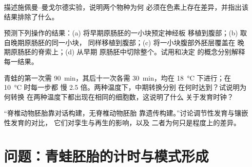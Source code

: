 \begin{exercise}[$\star\star$]\label{exo:b2:vertebrate-development:9}
描述施佩曼–曼戈尔德实验，说明两个物种为何
必须在色素上存在差异，并指出该结果排除了什么。
\end{exercise}

\begin{exercise}[$\star\star\star$]\label{exo:b2:vertebrate-development:10}
预测下列操作的结果：(a) 将早期原肠胚的一小块预定神经板
移植到腹部；(b) 取自晚期原肠胚的同一小块，
同样移植到腹部；(c) 将一小块腹部外胚层覆盖在
晚期原肠胚的脊索上；(d) 从早期
原肠胚中切除整个。试用和决定
的概念分别解释每一结果。
\end{exercise}

\begin{exercise}[$\star\star\star$]\label{exo:b2:vertebrate-development:11}
青蛙的第一次需 \qty{90}{min}，其后十一次各需
\qty{30}{min}，均在 \qty{18}{\celsius} 下进行；在 \qty{10}{\celsius} 时每一步都
慢 2.5 倍。两种温度下，中期转换分别
在何时达到？试说明为何转换
在两种温度下都出现在相同的细胞数，这说明了什么
关于发育时钟？
\end{exercise}

\begin{exercise}[$\star\star\star$]\label{exo:b2:vertebrate-development:12}
“脊椎动物胚胎靠对话构建，无脊椎动物胚胎
靠遗传构建。”讨论调节性发育与镶嵌性发育的对比，
它们对孪生与再生的影响，以及
二者为何只是程度上的差异。
\end{exercise}

\section{问题：青蛙胚胎的计时与模式形成}

